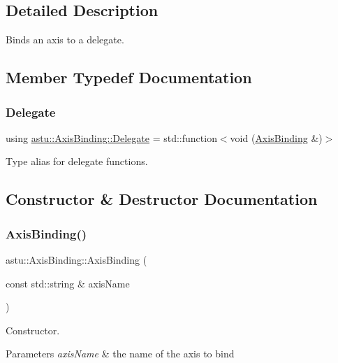 \subsection{Detailed Description}
Binds an axis to a delegate. 

\subsection{Member Typedef Documentation}
\mbox{\label{classastu_1_1AxisBinding_a38f398d407de503bd52019e244fa9687}} 
\subsubsection{\texorpdfstring{Delegate}{Delegate}}
{\footnotesize\ttfamily using \hyperlink{classastu_1_1AxisBinding_a38f398d407de503bd52019e244fa9687}{astu\+::\+Axis\+Binding\+::\+Delegate} =  std\+::function$<$void (\hyperlink{classastu_1_1AxisBinding}{Axis\+Binding} \&)$>$}

Type alias for delegate functions. 

\subsection{Constructor \& Destructor Documentation}
\mbox{\label{classastu_1_1AxisBinding_a196fdc402dcf64aa507e6d6b9d3757f9}} 
\subsubsection{\texorpdfstring{Axis\+Binding()}{AxisBinding()}}
{\footnotesize\ttfamily astu\+::\+Axis\+Binding\+::\+Axis\+Binding (\begin{DoxyParamCaption}\item[{const std\+::string \&}]{axis\+Name }\end{DoxyParamCaption})}

Constructor.


\begin{DoxyParams}{Parameters}
{\em axis\+Name} & the name of the axis to bind \\
\hline
\end{DoxyParams}


